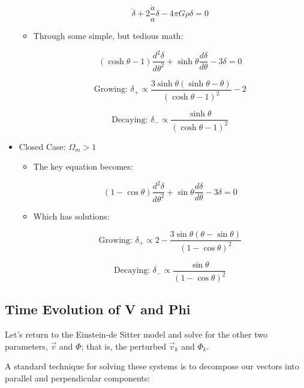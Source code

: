 \documentclass{article}
\newcommand{\be}{\begin{equation}}
\newcommand{\ee}{\end{equation}}
\begin{document}
\begin{itemize}
\begin{itemize}
        \be
        \ddot{\delta} + 2\frac{\dot{a}}{a} \delta - 4\pi G \rho \delta = 0
        \ee
        
        \item Through some simple, but tedious math:
        
        \be
        \left(\cosh\theta - 1\right) \frac{d^2 \delta}{d\theta^2} + \sinh\theta \frac{d\delta}{d\theta} - 3\delta = 0
        \ee
        
        \be
        \text{Growing: } \delta_+ \propto \frac{3\sinh\theta \left(\sinh\theta - \theta\right)}{\left(\cosh\theta - 1\right)^2} - 2
        \ee
        
        \be
        \text{Decaying: } \delta_- \propto \frac{\sinh\theta}{\left(\cosh\theta - 1\right)^2}
        \ee
        
    \end{itemize}
    
    \item Closed Case: $\Omega_m>1$
    
    \begin{itemize}
        \item The key equation becomes:
        
        \be
        \left(1-\cos\theta\right)\frac{d^2 \delta}{d\theta^2} + \sin\theta \frac{d\delta}{d\theta} - 3\delta = 0
        \ee
        
        \item Which has solutions:
        
        \be
        \text{Growing: } \delta_+ \propto 2 - \frac{3\sin\theta \left(\theta - \sin\theta\right)}{\left(1-\cos\theta\right)^2}
        \ee
        
        \be
        \text{Decaying: } \delta_- \propto \frac{\sin\theta}{\left(1-\cos\theta\right)^2}
        \ee
    \end{itemize}
\end{itemize}

\subsection{Time Evolution of V and Phi}

Let's return to the Einstein-de Sitter model and solve for the other two parameters, $\vec{v}$ and $\Phi$; that is, the perturbed $\vec{v}_k$ and $\Phi_k$. 

A standard technique for solving these systems is to decompose our vectors into parallel and perpendicular components:
\end{document}
